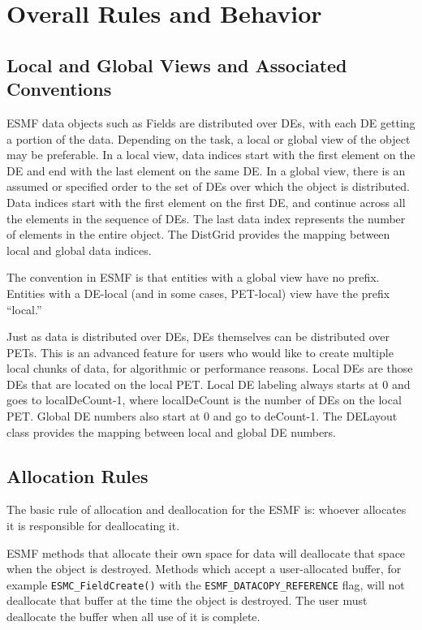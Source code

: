 \section{Overall Rules and Behavior}

\subsection{Local and Global Views and Associated Conventions}

ESMF data objects such as Fields are distributed over
DEs, with each DE getting a portion of the data.  Depending
on the task, a local or global view of the object may be
preferable.  In a local view, data indices start with the first
element on the DE and end with the last element on the same DE.
In a global view, there is an assumed or specified order to
the set of DEs over which the object is distributed.  Data
indices start with the first element on the first DE, and
continue across all the elements in the sequence of DEs.
The last data index represents the number of elements in the
entire object.  The DistGrid provides the mapping between
local and global data indices.

The convention in ESMF is that entities with a global view
have no prefix.  Entities with a DE-local (and in some cases,
PET-local) view have the prefix ``local.''

Just as data is distributed over DEs, DEs themselves can be
distributed over PETs.  This is an advanced feature for users
who would like to create multiple local chunks of data, for
algorithmic or performance reasons.
Local DEs are those DEs that are located on the local PET.
Local DE labeling always starts at 0 and goes to localDeCount-1,
where localDeCount is the number of DEs on the local PET.
Global DE numbers also start at 0 and go to deCount-1.
The DELayout class provides the mapping between local
and global DE numbers. 

\subsection{Allocation Rules}

The basic rule of allocation and deallocation for the ESMF is:
whoever allocates it is responsible for deallocating it.

ESMF methods that allocate their own space for data will
deallocate that space when the object is destroyed. 
Methods which accept a user-allocated buffer, for example
{\tt ESMC\_FieldCreate()} with the {\tt ESMF\_DATACOPY\_REFERENCE} flag,
will not deallocate that buffer at the time the object is
destroyed.  The user must deallocate the buffer
when all use of it is complete.

